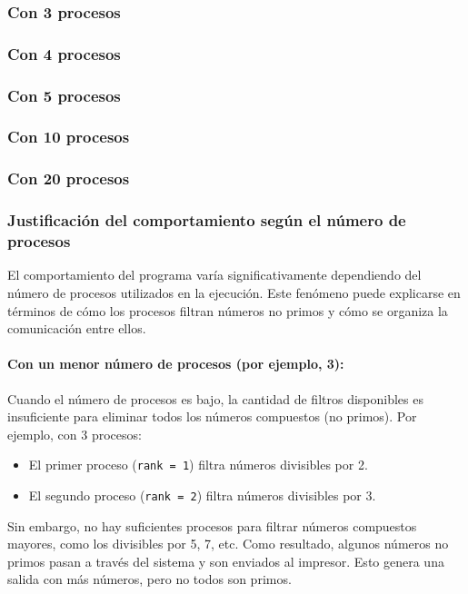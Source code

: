 \documentclass[a4paper,12pt]{article}
\begin{document}
\subsubsection{Con 3 procesos}


\subsubsection{Con 4 procesos}


\subsubsection{Con 5 procesos}


\subsubsection{Con 10 procesos}

\subsubsection{Con 20 procesos}


\subsubsection{Justificación del comportamiento según el número de procesos}

El comportamiento del programa varía significativamente dependiendo del número de procesos utilizados en la ejecución. Este fenómeno puede explicarse en términos de cómo los procesos filtran números no primos y cómo se organiza la comunicación entre ellos.

\paragraph{Con un menor número de procesos (por ejemplo, 3):}
Cuando el número de procesos es bajo, la cantidad de filtros disponibles es insuficiente para eliminar todos los números compuestos (no primos). Por ejemplo, con 3 procesos:
\begin{itemize}
    \item El primer proceso (\texttt{rank = 1}) filtra números divisibles por 2.
    \item El segundo proceso (\texttt{rank = 2}) filtra números divisibles por 3.
\end{itemize}
Sin embargo, no hay suficientes procesos para filtrar números compuestos mayores, como los divisibles por 5, 7, etc. Como resultado, algunos números no primos pasan a través del sistema y son enviados al impresor. Esto genera una salida con más números, pero no todos son primos.
\end{document}
